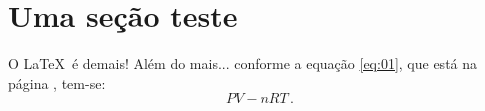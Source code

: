 \documentclass[a4paper,12pt]{article}
\begin{document}
\section{Uma seção teste}
O \LaTeX$\,$  é demais! Além do mais... conforme a equação \ref{eq:01}, que está na página \pageref{eq:01}, tem-se: 
\begin{equation}
PV - nRT\,.
\label{eq:01}
\end{equation}
\end{document}

